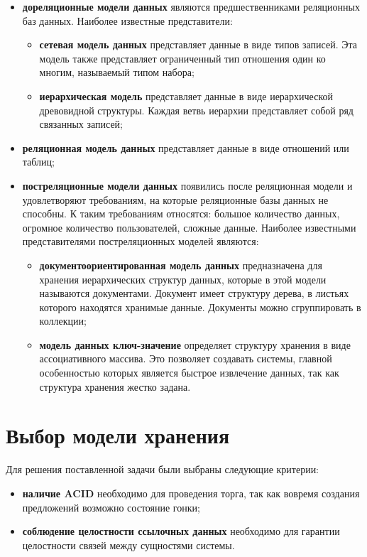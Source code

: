 \begin{itemize}
    \item \textbf{дореляционные модели данных} являются предшественниками реляционных баз данных. Наиболее известные представители:
    \begin{itemize}
        \item \textbf{сетевая модель данных} представляет данные в виде типов записей. Эта модель также представляет ограниченный тип отношения один ко многим, называемый типом набора;
        \item \textbf{иерархическая модель} представляет данные в виде иерархической древовидной структуры. Каждая ветвь иерархии представляет собой ряд связанных записей;
    \end{itemize}
    \item \textbf{реляционная модель данных} представляет данные в виде отношений или таблиц;
    \item \textbf{постреляционные модели данных} появились после реляционная модели и удовлетворяют требованиям, на которые реляционные базы данных не способны. К таким требованиям относятся: большое количество данных, огромное количество пользователей, сложные данные. Наиболее известными представителями постреляционных моделей являются:
    \begin{itemize}
        \item \textbf{документоориентированная модель данных} предназначена для хранения иерархических структур данных, которые в этой модели называются документами. Документ имеет структуру дерева, в листьях которого находятся хранимые данные. Документы можно сгруппировать в коллекции;
        \item \textbf{модель данных ключ-значение} определяет структуру хранения в виде ассоциативного массива. Это позволяет создавать системы, главной особенностью которых является быстрое извлечение данных, так как структура хранения жестко задана.
    \end{itemize}
\end{itemize}

\section{Выбор модели хранения}
Для решения поставленной задачи были выбраны следующие критерии:

\begin{itemize}
    \item \textbf{наличие ACID} необходимо для проведения торга, так как вовремя создания предложений возможно состояние гонки;
    \item \textbf{соблюдение целостности ссылочных данных} необходимо для гарантии целостности связей между сущностями системы.
\end{itemize}

